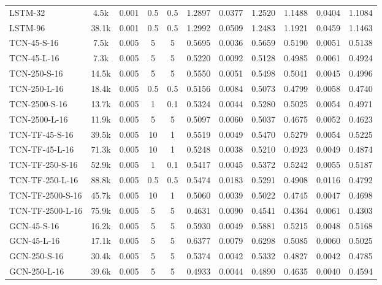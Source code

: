 \begin{table*}[h]
{\begin{tabular}{l c c cc >{\columncolor{gray!20}}ccc >{\columncolor{gray!20}}ccc}
            \hline
            LSTM-32 & 4.5k & 0.001 & 0.5 & 0.5 & 1.2897 & 0.0377 & 1.2520 & 1.1488 & 0.0404 & 1.1084 \\
            LSTM-96 & 38.1k & 0.001 & 0.5 & 0.5 & 1.2992 & 0.0509 & 1.2483 & 1.1921 & 0.0459 & 1.1463 \\
            \hline
            TCN-45-S-16 & 7.5k & 0.005 & 5 & 5 & 0.5695 & 0.0036 & 0.5659 & 0.5190 & 0.0051 & 0.5138 \\
            TCN-45-L-16 & 7.3k & 0.005 & 5 & 5 & 0.5220 & 0.0092 & 0.5128 & 0.4985 & 0.0061 & 0.4924 \\
            TCN-250-S-16 & 14.5k & 0.005 & 5 & 5 & 0.5550 & 0.0051 & 0.5498 & 0.5041 & 0.0045 & 0.4996 \\
            TCN-250-L-16 & 18.4k & 0.005 & 0.5 & 0.5 & 0.5156 & 0.0084 & 0.5073 & 0.4799 & 0.0058 & 0.4740 \\
            TCN-2500-S-16 & 13.7k & 0.005 & 1 & 0.1 & 0.5324 & 0.0044 & 0.5280 & 0.5025 & 0.0054 & 0.4971 \\
            TCN-2500-L-16 & 11.9k & 0.005 & 5 & 5 & 0.5097 & 0.0060 & 0.5037 & 0.4675 & 0.0052 & 0.4623 \\
            \hline
            TCN-TF-45-S-16 & 39.5k & 0.005 & 10 & 1 & 0.5519 & 0.0049 & 0.5470 & 0.5279 & 0.0054 & 0.5225 \\
            TCN-TF-45-L-16 & 71.3k & 0.005 & 10 & 1 & 0.5248 & 0.0038 & 0.5210 & 0.4923 & 0.0049 & 0.4874 \\
            TCN-TF-250-S-16 & 52.9k & 0.005 & 1 & 0.1 & 0.5417 & 0.0045 & 0.5372 & 0.5242 & 0.0055 & 0.5187 \\
            TCN-TF-250-L-16 & 88.8k & 0.005 & 0.5 & 0.5 & 0.5474 & 0.0183 & 0.5291 & 0.4908 & 0.0116 & 0.4792 \\
            TCN-TF-2500-S-16 & 45.7k & 0.005 & 10 & 1 & 0.5060 & 0.0039 & 0.5022 & 0.4745 & 0.0047 & 0.4698 \\
            TCN-TF-2500-L-16 & 75.9k & 0.005 & 5 & 5 & 0.4631 & 0.0090 & 0.4541 & 0.4364 & 0.0061 & 0.4303 \\
            \hline
            GCN-45-S-16 & 16.2k & 0.005 & 5 & 5 & 0.5930 & 0.0049 & 0.5881 & 0.5215 & 0.0048 & 0.5168 \\
            GCN-45-L-16 & 17.1k & 0.005 & 5 & 5 & 0.6377 & 0.0079 & 0.6298 & 0.5085 & 0.0060 & 0.5025 \\
            GCN-250-S-16 & 30.4k & 0.005 & 5 & 5 & 0.5374 & 0.0042 & 0.5332 & 0.4827 & 0.0042 & 0.4785 \\
            GCN-250-L-16 & 39.6k & 0.005 & 5 & 5 & 0.4933 & 0.0044 & 0.4890 & 0.4635 & 0.0040 & 0.4594 \\

\end{tabular}}
\end{table*}
